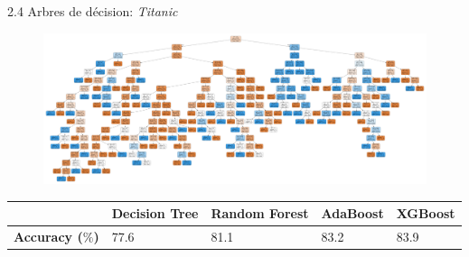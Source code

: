 \begin{frame}{2.4 Arbres de décision: \textit{Titanic}}
  \begin{figure}
    \includegraphics[width=\textwidth]{notebook/decisionTrees/titanic.pdf}
  \end{figure}
  \begin{table}
    \footnotesize
    \begin{tabular}{l|l|l|l|l}
      & \textbf{Decision Tree}  & \textbf{Random Forest}  & \textbf{AdaBoost}  & \textbf{XGBoost} \\
      \hline
      \textbf{Accuracy (\boldmath $\%$)} & 77.6 & 81.1 & 83.2 & 83.9 \\
    \end{tabular}
  \end{table}
\end{frame}

